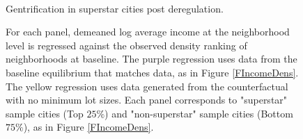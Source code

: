 \documentclass[12pt]{article}
\begin{document}
	
	\begin{figure}[htbp!]
		
		\caption{ \\ Gentrification in superstar cities post deregulation.}\label{figure:gentrification}
		
		\caption*{For each panel, demeaned log average income at the neighborhood level is regressed against the observed density ranking of neighborhoods at baseline. The purple regression uses data from the baseline equilibrium that matches data, as in Figure \ref{FIncomeDens}. The yellow regression uses data generated from the counterfactual with no minimum lot sizes. Each panel corresponds to "superstar" sample cities (Top $25 \%$) and "non-superstar" sample cities (Bottom $75 \%$), as in Figure \ref{FIncomeDens}. }
		
	\end{figure}
	
	\begin{figure}[htbp!]
		
	
	\end{figure}
	
\end{document}
